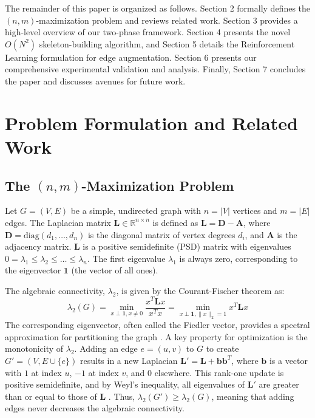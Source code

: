 \documentclass{article}
\begin{document}
The remainder of this paper is organized as follows. Section 2 formally defines the $(n, m)$-maximization problem and reviews related work. Section 3 provides a high-level overview of our two-phase framework. Section 4 presents the novel $O(N^2)$ skeleton-building algorithm, and Section 5 details the Reinforcement Learning formulation for edge augmentation. Section 6 presents our comprehensive experimental validation and analysis. Finally, Section 7 concludes the paper and discusses avenues for future work.

\section{Problem Formulation and Related Work}

\subsection{The $(n, m)$-Maximization Problem}

Let $G = (V, E)$ be a simple, undirected graph with $n = |V|$ vertices and $m = |E|$ edges. The Laplacian matrix $\mathbf{L} \in \mathbb{R}^{n \times n}$ is defined as $\mathbf{L} = \mathbf{D} - \mathbf{A}$, where $\mathbf{D} = \text{diag}(d_1, \dots, d_n)$ is the diagonal matrix of vertex degrees $d_i$, and $\mathbf{A}$ is the adjacency matrix. $\mathbf{L}$ is a positive semidefinite (PSD) matrix with eigenvalues $0 = \lambda_1 \le \lambda_2 \le \dots \le \lambda_n$. The first eigenvalue $\lambda_1$ is always zero, corresponding to the eigenvector $\mathbf{1}$ (the vector of all ones).

The algebraic connectivity, $\lambda_2$, is given by the Courant-Fischer theorem as:
\begin{equation}
    \lambda_2(G) = \min_{x \perp \mathbf{1}, x \neq 0} \frac{x^T \mathbf{L} x}{x^T x} = \min_{x \perp \mathbf{1}, \|x\|_2=1} x^T \mathbf{L} x
\end{equation}
The corresponding eigenvector, often called the Fiedler vector, provides a spectral approximation for partitioning the graph \cite{fiedler1973algebraic}. A key property for optimization is the monotonicity of $\lambda_2$. Adding an edge $e = (u, v)$ to $G$ to create $G' = (V, E \cup \{e\})$ results in a new Laplacian $\mathbf{L}' = \mathbf{L} + \mathbf{b}\mathbf{b}^T$, where $\mathbf{b}$ is a vector with $1$ at index $u$, $-1$ at index $v$, and $0$ elsewhere. This rank-one update is positive semidefinite, and by Weyl's inequality, all eigenvalues of $\mathbf{L}'$ are greater than or equal to those of $\mathbf{L}$ \cite{HornJohnson2013}. Thus, $\lambda_2(G') \ge \lambda_2(G)$, meaning that adding edges never decreases the algebraic connectivity.
\end{document}
